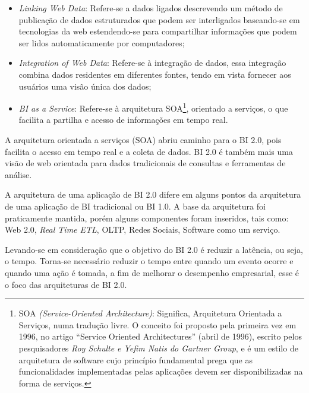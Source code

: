 \begin{itemize}
    \item \textit{Linking Web Data}: Refere-se a dados ligados descrevendo um m\'{e}todo de publica\c{c}\~{a}o de dados estruturados que podem ser interligados baseando-se em tecnologias da web estendendo-se para compartilhar informa\c{c}\~{o}es que podem ser lidos automaticamente por computadores; 
    
    \item \textit{Integration of Web Data}: Refere-se \`{a} integra\c{c}\~{a}o de dados, essa integra\c{c}\~{a}o combina dados residentes em diferentes fontes, tendo em vista fornecer aos usu\'{a}rios uma vis\~{a}o única dos dados;
    
    \item \textit{BI as a Service}: Refere-se \`{a} arquitetura SOA\footnote{SOA \textit{(Service-Oriented Architecture)}: Significa, Arquitetura Orientada a Servi\c{c}os, numa tradu\c{c}\~{a}o livre. O conceito foi proposto pela primeira vez em 1996, no artigo “Service Oriented Architectures” (abril de 1996), escrito pelos pesquisadores \textit{Roy Schulte e Yefim Natis do Gartner Group}, e \'{e} um estilo de arquitetura de software cujo princ\'{i}pio fundamental prega que as funcionalidades implementadas pelas aplica\c{c}\~{o}es devem ser disponibilizadas na forma de servi\c{c}os.}, orientado a servi\c{c}os, o que facilita a partilha e acesso de informa\c{c}\~{o}es em tempo real.

\end{itemize}

A arquitetura orientada a servi\c{c}os (SOA) abriu caminho para o BI 2.0, pois facilita o acesso em tempo real e a coleta de dados. BI 2.0 \'{e} tamb\'{e}m mais uma vis\~{a}o de web orientada para dados tradicionais de consultas e ferramentas de an\'{a}lise.

A arquitetura de uma aplica\c{c}\~{a}o de BI 2.0 difere em alguns pontos da arquitetura de uma aplica\c{c}\~{a}o de BI tradicional ou BI 1.0. A base da arquitetura foi praticamente mantida, por\'{e}m alguns componentes foram inseridos, tais como: Web 2.0, \textit{Real Time ETL}, OLTP, Redes Sociais, Software como um servi\c{c}o.

Levando-se em considera\c{c}\~{a}o que o objetivo do BI 2.0 \'{e} reduzir a lat\^{e}ncia, ou seja, o tempo. Torna-se necess\'{a}rio reduzir o tempo entre quando um evento ocorre e quando uma a\c{c}\~{a}o \'{e} tomada, a fim de melhorar o desempenho empresarial, esse \'{e} o foco das arquiteturas de BI 2.0. 

